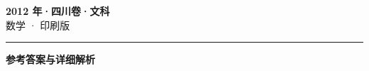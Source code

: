 \documentclass[zihao=5, a4paper]{ctexart}
\begin{document}
\begin{center}
  {\Large\bfseries 2012 年·四川卷·文科}\\[4pt]
  {\large 数学 · 印刷版}
\end{center}
\medskip
{}

\par\bigskip\hrule\bigskip
{}
\Needspace{0.55\textheight}
\begin{center}{\large\bfseries 参考答案与详细解析}\end{center}
\smallskip

\end{document}
